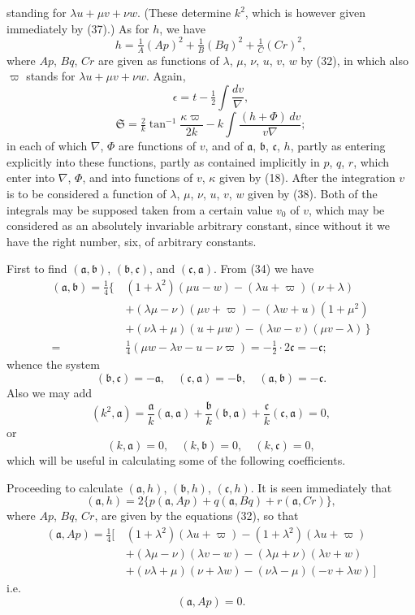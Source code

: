\documentclass[11pt]{article}
\begin{document}
standing for $\lambda u + \mu v + \nu w$. (These determine $k^2$, which is however given immediately by (37).) As for $h$, we have
\[
h = \tfrac{1}{A}(Ap)^2 + \tfrac{1}{B}(Bq)^2 + \tfrac{1}{C}(Cr)^2,
\]
where $Ap$, $Bq$, $Cr$ are given as functions of $\lambda$, $\mu$, $\nu$, $u$, $v$, $w$ by (32), in which also $\varpi$ stands for $\lambda u + \mu v + \nu w$. Again,
\[
\epsilon = t - \tfrac{1}{2}\!\int\!\frac{dv}{\nabla},
\]
\[
\mathfrak{S} = \tfrac{2}{k}\tan^{-1}\!\frac{\kappa\varpi}{2k} - k\!\int\!\frac{(h + \Phi)\,dv}{v\nabla};
\]
in each of which $\nabla$, $\Phi$ are functions of $v$, and of $\mathfrak{a}$, $\mathfrak{b}$, $\mathfrak{c}$, $h$, partly as entering explicitly into these functions, partly as contained implicitly in $p$, $q$, $r$, which enter into $\nabla$, $\Phi$, and into functions of $v$, $\kappa$ given by (18). After the integration $v$ is to be considered a function of $\lambda$, $\mu$, $\nu$, $u$, $v$, $w$ given by (38). Both of the integrals may be supposed taken from a certain value $v_0$ of $v$, which may be considered as an absolutely invariable arbitrary constant, since without it we have the right number, six, of arbitrary constants.

First to find $(\mathfrak{a}, \mathfrak{b})$, $(\mathfrak{b}, \mathfrak{c})$, and $(\mathfrak{c}, \mathfrak{a})$. From (34) we have
\begin{align*}
(\mathfrak{a}, \mathfrak{b}) = \tfrac{1}{4}\big\{\, & (1 + \lambda^2)(\mu u - w) - (\lambda u + \varpi)(\nu + \lambda) \\
& + (\lambda\mu - \nu)(\mu v + \varpi) - (\lambda w + u)(1 + \mu^2) \\
& + (\nu\lambda + \mu)(u + \mu w) - (\lambda w - v)(\mu v - \lambda)\,\big\} \\
= {}&\tfrac{1}{4}(\mu w - \lambda v - u - \nu\varpi) = -\tfrac{1}{2}\cdot 2\mathfrak{c} = -\mathfrak{c};
\end{align*}
whence the system
\[
(\mathfrak{b}, \mathfrak{c}) = -\mathfrak{a},\quad (\mathfrak{c}, \mathfrak{a}) = -\mathfrak{b},\quad (\mathfrak{a}, \mathfrak{b}) = -\mathfrak{c}. \tag{40}
\]
Also we may add
\[
(k^2, \mathfrak{a}) = \frac{\mathfrak{a}}{k}(\mathfrak{a}, \mathfrak{a}) + \frac{\mathfrak{b}}{k}(\mathfrak{b}, \mathfrak{a}) + \frac{\mathfrak{c}}{k}(\mathfrak{c}, \mathfrak{a}) = 0,
\]
or
\[
(k, \mathfrak{a}) = 0,\quad (k, \mathfrak{b}) = 0,\quad (k, \mathfrak{c}) = 0, \tag{41}
\]
which will be useful in calculating some of the following coefficients.

Proceeding to calculate $(\mathfrak{a}, h)$, $(\mathfrak{b}, h)$, $(\mathfrak{c}, h)$. It is seen immediately that
\[
(\mathfrak{a}, h) = 2\{p(\mathfrak{a}, Ap) + q(\mathfrak{a}, Bq) + r(\mathfrak{a}, Cr)\},
\]
where $Ap$, $Bq$, $Cr$, are given by the equations (32), so that
\begin{align*}
(\mathfrak{a}, Ap) = \tfrac{1}{4}\big[\, & (1 + \lambda^2)(\lambda u + \varpi) - (1 + \lambda^2)(\lambda u + \varpi) \\
& + (\lambda\mu - \nu)(\lambda v - w) - (\lambda\mu + \nu)(\lambda v + w) \\
& + (\nu\lambda + \mu)(\nu + \lambda w) - (\nu\lambda - \mu)(-v + \lambda w)\,\big]
\end{align*}
i.e.
\[
(\mathfrak{a}, Ap) = 0. \tag{42}
\]
\end{document}
